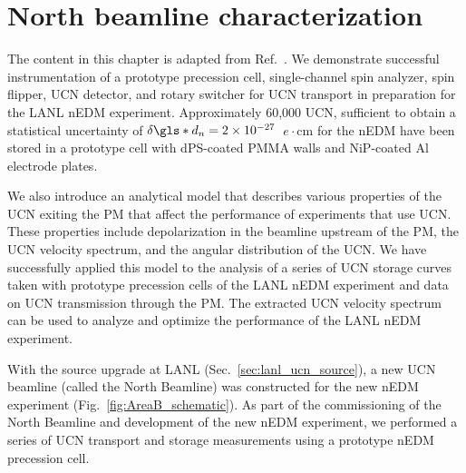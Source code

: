 
\chapter{North beamline characterization}
\label{chap:north_beamline_paper}


The content in this chapter is adapted from Ref.~\cite{wong_north_beamline_2023}. We demonstrate successful instrumentation of a prototype precession cell, single-channel spin analyzer, spin flipper, UCN detector, and rotary switcher for UCN transport in preparation for the LANL nEDM experiment. Approximately 60,000 UCN, sufficient to obtain a statistical uncertainty of $\delta \gls*{d_n} = 2\times 10^{-27}$~$e\cdot\text{cm}$ for the nEDM have been stored in a prototype cell with dPS-coated PMMA walls and NiP-coated Al electrode plates. 

We also introduce an analytical model that describes various properties of the UCN exiting the PM that affect the performance of experiments that use UCN. These properties include depolarization in the beamline upstream of the PM, the UCN velocity spectrum, and the angular distribution of the UCN. We have successfully applied this model to the analysis of a series of UCN storage curves taken with prototype precession cells of the LANL nEDM experiment and data on UCN transmission through the PM. The extracted UCN velocity spectrum can be used to analyze and optimize the performance of the LANL nEDM experiment. 

With the \ucn source upgrade at LANL (Sec.~\ref{sec:lanl_ucn_source}), a new UCN beamline (called the North Beamline) was constructed for the new nEDM experiment (Fig.~\ref{fig:AreaB_schematic}). As part of the commissioning of the North Beamline and development of the new nEDM experiment, we performed a series of UCN transport and storage measurements using a prototype nEDM precession cell. 

